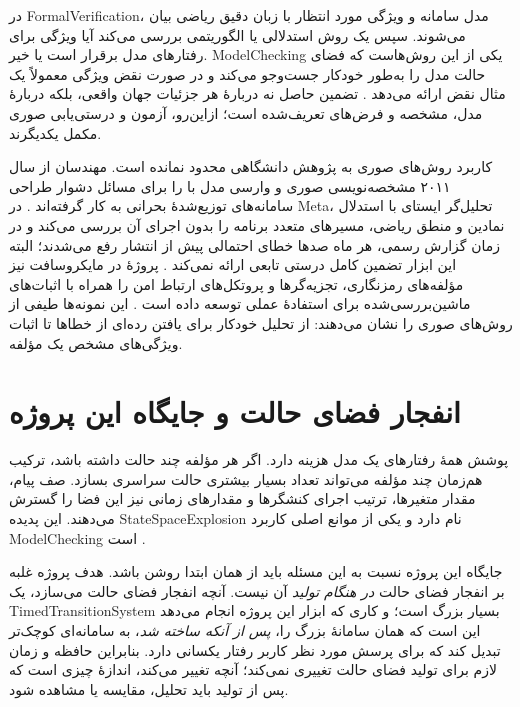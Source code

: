 در \gls{FormalVerification}، مدل سامانه و ویژگی مورد انتظار با زبان دقیق ریاضی بیان می‌شوند. سپس یک روش استدلالی یا الگوریتمی بررسی می‌کند آیا ویژگی برای رفتارهای مدل برقرار است یا خیر. \gls{ModelChecking} یکی از این روش‌هاست که فضای حالت مدل را به‌طور خودکار جست‌وجو می‌کند و در صورت نقض ویژگی معمولاً یک مثال نقض ارائه می‌دهد \cite{ClarkeGrumbergPeled1999,BaierKatoen2008}. تضمین حاصل نه دربارهٔ هر جزئیات جهان واقعی، بلکه دربارهٔ مدل، مشخصه و فرض‌های تعریف‌شده است؛ ازاین‌رو، آزمون و درستی‌یابی صوری مکمل یکدیگرند.

کاربرد روش‌های صوری به پژوهش دانشگاهی محدود نمانده است. مهندسان  از سال ۲۰۱۱ مشخصه‌نویسی صوری و وارسی مدل با  را برای مسائل دشوار طراحی سامانه‌های توزیع‌شدهٔ بحرانی به کار گرفته‌اند \cite{NewcombeEtAl2015}. در Meta، تحلیل‌گر ایستای  با استدلال نمادین و منطق ریاضی، مسیرهای متعدد برنامه را بدون اجرای آن بررسی می‌کند و در زمان گزارش رسمی، هر ماه صدها خطای احتمالی پیش از انتشار رفع می‌شدند؛ البته این ابزار تضمین کامل درستی تابعی ارائه نمی‌کند \cite{MetaInfer2015}. پروژهٔ  در مایکروسافت نیز مؤلفه‌های رمزنگاری، تجزیه‌گرها و پروتکل‌های ارتباط امن را همراه با اثبات‌های ماشین‌بررسی‌شده برای استفادهٔ عملی توسعه داده است \cite{MicrosoftEverest2019}. این نمونه‌ها طیفی از روش‌های صوری را نشان می‌دهند: از تحلیل خودکار برای یافتن رده‌ای از خطاها تا اثبات ویژگی‌های مشخص یک مؤلفه.

\section{انفجار فضای حالت و جایگاه این پروژه}
\label{sec:state-space-explosion-position}

پوشش همهٔ رفتارهای یک مدل هزینه دارد. اگر هر مؤلفه چند حالت داشته باشد، ترکیب هم‌زمان چند مؤلفه می‌تواند تعداد بسیار بیشتری حالت سراسری بسازد. صف پیام، مقدار متغیرها، ترتیب اجرای کنشگرها و مقدارهای زمانی نیز این فضا را گسترش می‌دهند. این پدیده \gls{StateSpaceExplosion} نام دارد و یکی از موانع اصلی کاربرد \gls{ModelChecking} است \cite{ClarkeGrumbergPeled1999,BaierKatoen2008}.

جایگاه این پروژه نسبت به این مسئله باید از همان ابتدا روشن باشد. هدف پروژه غلبه بر انفجار فضای حالت \emph{در هنگام تولید} آن نیست. آنچه انفجار فضای حالت می‌سازد، یک \gls{TimedTransitionSystem} بسیار بزرگ است؛ و کاری که ابزار این پروژه انجام می‌دهد این است که همان سامانهٔ بزرگ را، \emph{پس از آنکه ساخته شد}، به سامانه‌ای کوچک‌تر تبدیل کند که برای پرسش مورد نظر کاربر رفتار یکسانی دارد. بنابراین حافظه و زمان لازم برای تولید فضای حالت تغییری نمی‌کند؛ آنچه تغییر می‌کند، اندازهٔ چیزی است که پس از تولید باید تحلیل، مقایسه یا مشاهده شود.

